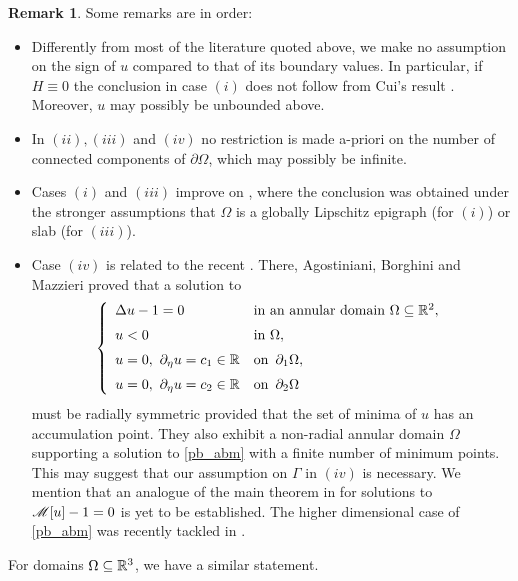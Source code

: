 \documentclass[10 pt,a4paper]{article}
\theoremstyle{definition}
\newtheorem{remark}[definition]{Remark}
\begin{document}
\begin{remark}
	Some remarks are in order:
	\begin{itemize}
		\item[-] Differently from most of the literature quoted above, we make no assumption on the sign of $u$ compared to that of its boundary values. In particular, if $H\equiv 0$ the conclusion in case $(i)$ does not follow from Cui's result \cite{cui}. Moreover, $u$ may possibly be unbounded above. 
		\item[-] In $(ii),(iii)$ and $(iv)$ no restriction is made a-priori on the number of connected components of $\partial \Omega$, which may possibly be infinite. 
		\item[-] Cases $(i)$ and $(iii)$ improve on \cite[Thm. 1.3]{cmr}, where the conclusion was obtained under the stronger assumptions that $\Omega$ is a globally Lipschitz epigraph (for $(i)$) or slab (for $(iii)$). 
		\item[-] Case $(iv)$ is related to the recent \cite{abm}. There, Agostiniani, Borghini and Mazzieri proved that a solution to 
		\begin{equation}\label{pb_abm}
			\left\{
			\begin{array}{ll}
				\Delta u - 1 = 0 & \text{in an annular domain }  \Omega \subseteq \mathbb R^2,  \\[0.2cm]
				u < 0 & \text{in } \Omega, \\[0.2cm]
				u=0, \ \partial_\eta u = c_1 \in \mathbb R & \text{on } \, \partial_1\Omega, \\[0.2cm]
				u=0, \ \partial_\eta u = c_2 \in \mathbb R  & \text{on } \, \partial_2\Omega
			\end{array}\right.
		\end{equation}
		must be radially symmetric provided that the set of minima of $u$ has an accumulation point. They also exhibit a non-radial annular domain $\Omega$ supporting a solution to \eqref{pb_abm} with a finite number of minimum points. This may suggest that our assumption on $\Gamma$ in $(iv)$ is necessary. We mention that an analogue of the main theorem in \cite{abm} for solutions to $\mathscr{M}[u] - 1 = 0$ is yet to be established. The higher dimensional case of \eqref{pb_abm} was recently tackled in \cite{abbm}. 		
	\end{itemize}
\end{remark}

For domains $\Omega \subseteq \mathbb R^3$, we have a similar statement. 
\end{document}
